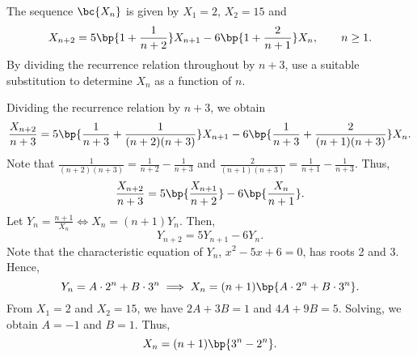 \clearpage
\begin{problem}
    The sequence $\bc{X_n}$ is given by $X_1 = 2$, $X_2 = 15$ and \[X_{n+2} = 5\bp{1 + \frac1{n+2}}X_{n+1} - 6\bp{1 + \frac2{n+1}}X_n, \qquad n \geq 1.\] By dividing the recurrence relation throughout by $n+3$, use a suitable substitution to determine $X_n$ as a function of $n$.
\end{problem}
\begin{solution}
    Dividing the recurrence relation by $n+3$, we obtain \[\frac{X_{n+2}}{n+3} = 5\bp{\frac1{n+3} + \frac1{(n+2)(n+3)}}X_{n+1} - 6\bp{\frac1{n+3} + \frac2{(n+1)(n+3)}}X_n.\] Note that $\frac1{(n+2)(n+3)} = \frac1{n+2} - \frac1{n+3}$ and $\frac{2}{(n+1)(n+3)} = \frac1{n+1} - \frac1{n+3}$. Thus, \[\frac{X_{n+2}}{n+3} = 5\bp{\frac{X_{n+1}}{n+2}} - 6\bp{\frac{X_n}{n+1}}.\] Let $Y_n = \frac{n + 1}{X_n} \iff X_n = (n+1)Y_n$. Then, \[Y_{n+2} = 5 Y_{n+1} - 6Y_n.\] Note that the characteristic equation of $Y_n$, $x^2 - 5x + 6 = 0$, has roots 2 and 3. Hence, \[Y_n = A \cdot 2^n + B \cdot 3^n \implies X_n = (n+1) \bp{A \cdot 2^n + B \cdot 3^n}.\] From $X_1 = 2$ and $X_2 = 15$, we have $2A + 3B = 1$ and $4A + 9B = 5$. Solving, we obtain $A = -1$ and $B = 1$. Thus, \[X_n = (n+1)\bp{3^n - 2^n}.\]
\end{solution}

